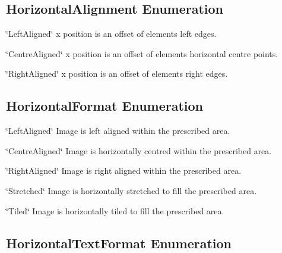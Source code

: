 \hypertarget{fal_enum_ref_fal_enum_ref_sec_5}{}\subsection{Horizontal\+Alignment Enumeration}\label{fal_enum_ref_fal_enum_ref_sec_5}
\begin{DoxyItemize}
\item {\ttfamily \char`\"{}\+Left\+Aligned\char`\"{}} x position is an offset of element\textquotesingle{}s left edges. \item {\ttfamily \char`\"{}\+Centre\+Aligned\char`\"{}} x position is an offset of element\textquotesingle{}s horizontal centre points. \item {\ttfamily \char`\"{}\+Right\+Aligned\char`\"{}} x position is an offset of element\textquotesingle{}s right edges.\end{DoxyItemize}
\hypertarget{fal_enum_ref_fal_enum_ref_sec_6}{}\subsection{Horizontal\+Format Enumeration}\label{fal_enum_ref_fal_enum_ref_sec_6}
\begin{DoxyItemize}
\item {\ttfamily \char`\"{}\+Left\+Aligned\char`\"{}} Image is left aligned within the prescribed area. \item {\ttfamily \char`\"{}\+Centre\+Aligned\char`\"{}} Image is horizontally centred within the prescribed area. \item {\ttfamily \char`\"{}\+Right\+Aligned\char`\"{}} Image is right aligned within the prescribed area. \item {\ttfamily \char`\"{}\+Stretched\char`\"{}} Image is horizontally stretched to fill the prescribed area. \item {\ttfamily \char`\"{}\+Tiled\char`\"{}} Image is horizontally tiled to fill the prescribed area.\end{DoxyItemize}
\hypertarget{fal_enum_ref_fal_enum_ref_sec_7}{}\subsection{Horizontal\+Text\+Format Enumeration}\label{fal_enum_ref_fal_enum_ref_sec_7}
